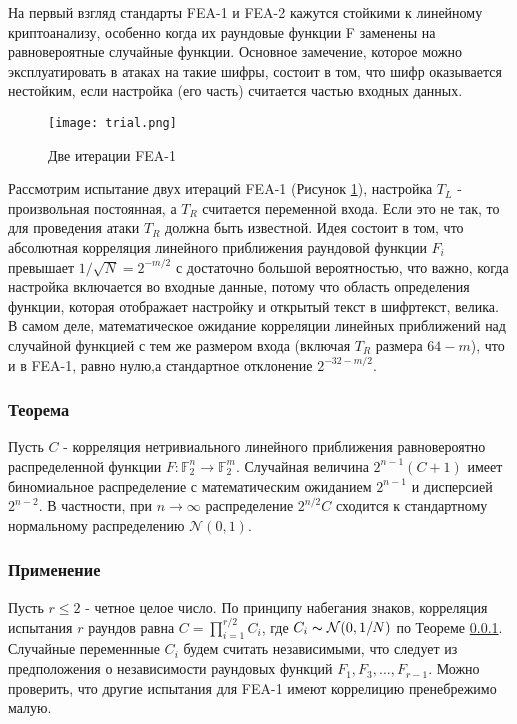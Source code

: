 \documentclass[utf8x, 14pt]{G7-32} %
\begin{document}
На первый взгляд стандарты FEA-1 и FEA-2 кажутся стойкими к линейному криптоанализу, особенно когда их раундовые функции F заменены на равновероятные случайные функции. Основное замечение, которое можно эксплуатировать в атаках на такие шифры, состоит в том, что шифр оказывается нестойким, если настройка (его часть) считается частью входных данных.

\begin{figure}[h!]
	\centering
	\texttt{[image: trial.png]}
	\caption{Две итерации FEA-1}
	\label{fig:trial}
\end{figure}

Рассмотрим испытание двух итераций FEA-1 (Рисунок \ref{fig:trial}), настройка $T_L$ - произвольная постоянная, а $T_R$ считается переменной входа. Если это не так, то для проведения атаки $T_R$ должна быть известной. Идея состоит в том, что абсолютная корреляция линейного приближения раундовой функции $F_i$ превышает $1/\sqrt{N} = 2^{-m/2}$ с достаточно большой вероятностью, что важно, когда настройка включается во входные данные, потому что область определения функции, которая отображает настройку и открытый текст в шифртекст, велика. В самом деле, математическое ожидание корреляции линейных приближений над случайной функцией с тем же размером входа (включая $T_R$ размера $64-m$), что и в FEA-1, равно нулю,а стандартное отклонение $2^{-32-m/2}$. 

\subsubsection{Теорема}\label{theorem}

 Пусть $C$ - корреляция нетривиального линейного приближения равновероятно распределенной функции $F: \mathbb{F}_2^n \to \mathbb{F}_2^m$. Случайная величина $2^{n-1}(C+1)$ имеет биномиальное распределение с математическим ожиданием $2^{n-1}$ и дисперсией $2^{n-2}$. В частности, при $n\to\infty$ распределение $2^{n/2}C$ сходится к стандартному нормальному распределению $\mathcal{N}(0,1)$.

\subsubsection{Применение}

Пусть $r\leq 2$ - четное целое число. По принципу набегания знаков, корреляция испытания $r$ раундов равна $C=\prod_{i=1}^{r/2} C_i$, где $C_i \thicksim \mathcal{N}(0,1/N)$ по Теореме \ref{theorem}. Случайные переменнные $C_i$ будем считать независимыми, что следует из предположения о независимости раундовых функций $F_1, F_3, ..., F_{r-1}$. Можно проверить, что другие испытания для FEA-1 имеют коррелицию пренебрежимо малую.
\end{document}
